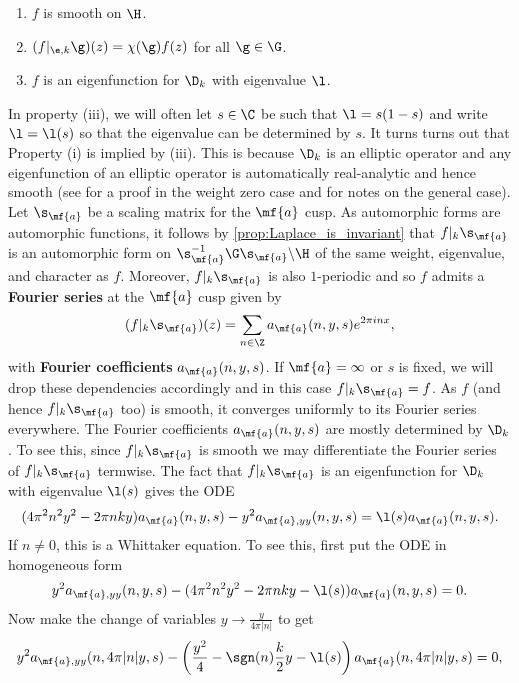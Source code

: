     \begin{enumerate}[label=(\roman*)]
      \item $f$ is smooth on $\H$.
      \item $(f|_{\e,k}\g)(z) = \chi(\g)f(z)$ for all $\g \in \G$.
      \item $f$ is an eigenfunction for $\D_{k}$ with eigenvalue $\l$.
    \end{enumerate}
    In property (iii), we will often let $s \in \C$ be such that $\l = s(1-s)$ and write $\l = \l(s)$ so that the eigenvalue can be determined by $s$. It turns turns out that Property (i) is implied by (iii). This is because $\D_{k}$ is an elliptic operator and any eigenfunction of an elliptic operator is automatically real-analytic and hence smooth (see \cite{evans2022partial} for a proof in the weight zero case and \cite{duke2002subconvexity} for notes on the general case). Let $\s_{\mf{a}}$ be a scaling matrix for the $\mf{a}$ cusp. As automorphic forms are automorphic functions, it follows by \cref{prop:Laplace_is_invariant} that $f|_{k}\s_{\mf{a}}$ is an automorphic form on $\s_{\mf{a}}^{-1}\G\s_{\mf{a}}\backslash\H$ of the same weight, eigenvalue, and character as $f$. Moreover, $f|_{k}\s_{\mf{a}}$ is also $1$-periodic and so $f$ admits a \textbf{Fourier series} at the $\mf{a}$ cusp given by
    \[
      (f|_{k}\s_{\mf{a}})(z) = \sum_{n \in \Z}a_{\mf{a}}(n,y,s)e^{2\pi inx},
    \]
    with \textbf{Fourier coefficients} $a_{\mf{a}}(n,y,s)$. If $\mf{a} = \infty$ or $s$ is fixed, we will drop these dependencies accordingly and in this case $f|_{k}\s_{\mf{a}} = f$. As $f$ (and hence $f|_{k}\s_{\mf{a}}$ too) is smooth, it converges uniformly to its Fourier series everywhere. The Fourier coefficients $a_{\mf{a}}(n,y,s)$ are mostly determined by $\D_{k}$. To see this, since $f|_{k}\s_{\mf{a}}$ is smooth we may differentiate the Fourier series of $f|_{k}\s_{\mf{a}}$ termwise. The fact that $f|_{k}\s_{\mf{a}}$ is an eigenfunction for $\D_{k}$ with eigenvalue $\l(s)$ gives the ODE
    \[
      (4\pi^{2}n^{2}y^{2}-2\pi nky)a_{\mf{a}}(n,y,s)-y^{2}a_{\mf{a},yy}(n,y,s) = \l(s)a_{\mf{a}}(n,y,s).
    \]
    If $n \neq 0$, this is a Whittaker equation. To see this, first put the ODE in homogeneous form
    \[
      y^{2}a_{\mf{a},yy}(n,y,s)-(4\pi^{2}n^{2}y^{2}-2\pi nky-\l(s))a_{\mf{a}}(n,y,s) = 0.
    \]
    Now make the change of variables $y \to \frac{y}{4\pi|n|}$ to get
    \[
      y^{2}a_{\mf{a},yy}(n,4\pi|n|y,s)-\left(\frac{y^{2}}{4}-\sgn(n)\frac{k}{2}y-\l(s)\right)a_{\mf{a}}(n,4\pi|n|y,s) = 0,
    \]
